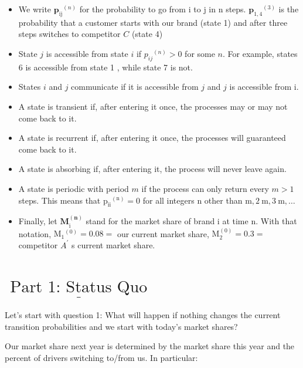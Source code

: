 \documentclass[10pt]{article}
\begin{document}
\begin{itemize}
  \item We write $\mathbf{p}_{\mathrm{ij}}{ }^{(n)}$ for the probability to go from $\mathrm{i}$ to $\mathrm{j}$ in $\mathrm{n}$ steps. $\mathbf{p}_{1,4}{ }^{(3)}$ is the probability that a customer starts with our brand (state 1) and after three steps switches to competitor $C$ (state 4)

  \item State $j$ is accessible from state $i$ if $p_{i j}{ }^{(n)}>0$ for some $n$. For example, states 6 is accessible from state 1 , while state 7 is not.

  \item States $i$ and $j$ communicate if it is accessible from $j$ and $j$ is accessible from i.

  \item A state is transient if, after entering it once, the processes may or may not come back to it.

  \item A state is recurrent if, after entering it once, the processes will guaranteed come back to it.

  \item A state is absorbing if, after entering it, the process will never leave again.

  \item A state is periodic with period $m$ if the process can only return every $m>1$ steps. This means that $\mathrm{p}_{\mathrm{ii}}{ }^{(\mathrm{n})}=0$ for all integers $\mathrm{n}$ other than $\mathrm{m}, 2 \mathrm{~m}, 3 \mathrm{~m}, \ldots$

  \item Finally, let $\mathbf{M}_{\mathrm{i}}^{(\mathbf{n})}$ stand for the market share of brand $\mathrm{i}$ at time $\mathrm{n}$. With that notation, $\mathrm{M}_{1}{ }^{(0)}=0.08=$ our current market share, $\mathrm{M}_{2}^{(0)}=0.3=$ competitor $A^{\prime}$ s current market share.

\end{itemize}
\section{$\underline{\text { Part 1: Status Quo }}$}
Let's start with question 1: What will happen if nothing changes the current transition probabilities and we start with today's market shares?

Our market share next year is determined by the market share this year and the percent of drivers switching to/from us. In particular:
\end{document}
